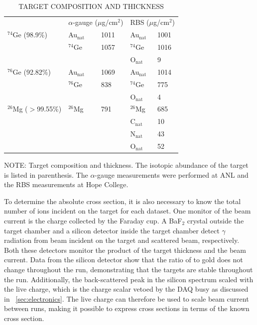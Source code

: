 \begin{table}[htp]
\centering
\caption[\uppercase{target composition and thickness}]{\\\uppercase{target composition and thickness}}
\label{tab:targets}
\begin{tabular}{lllll}\toprule
 & \multicolumn{2}{c}{$\alpha$-gauge ($\mu$g/cm$^2$)} & \multicolumn{2}{c}{RBS ($\mu$g/cm$^2$)} \\
\cmidrule(r){2-5}
$^{74}$Ge (98.9\%) & Au$_{\text{nat}}$ & 1011 & Au$_{\text{nat}}$ & 1001 \\
          & $^{74}$Ge & 1057 & $^{74}$Ge & 1016 \\
          &           &      & O$_{\text{nat}}$ & 9 \\[0.35cm]

$^{76}$Ge (92.82\%) & Au$_{\text{nat}}$ & 1069 & Au$_{\text{nat}}$ & 1014 \\
          & $^{76}$Ge & 838 & $^{74}$Ge & 775 \\
          &           &      & O$_{\text{nat}}$ & 4 \\[0.35cm]

$^{26}$Mg ($>$99.55\%) & $^{26}$Mg & 791 & $^{26}$Mg & 685 \\
          &           &      & C$_{\text{nat}}$ & 10 \\
          &           &      & N$_{\text{nat}}$ & 43 \\
          &           &      & O$_{\text{nat}}$ & 52 \\
\bottomrule
\end{tabular}
\begin{flushleft}
\small NOTE:
Target composition and thickness.  The isotopic abundance of the target is listed in parenthesis.  The $\alpha$-gauge measurements were performed at ANL and the RBS measurements at Hope College.
\end{flushleft}
\end{table}

To determine the absolute cross section, it is also necessary to know the total number of  ions incident on the target for each dataset.  One monitor of the beam current is the charge collected by the Faraday cup.  A BaF$_2$ crystal outside the target chamber and a silicon detector inside the target chamber detect $\gamma$ radiation from beam incident on the target and scattered  beam, respectively.  Both these detectors monitor the product of the target thickness and the beam current.  Data from the silicon detector show that the ratio of \GeTargets to gold does not change throughout the run, demonstrating that the targets are stable throughout the run.  Additionally, the back-scattered peak in the silicon spectrum scaled with the live charge, which is the charge scalar vetoed by the DAQ busy as discussed in {\sect}~\ref{sec:electronics}.  The live charge can therefore be used to scale beam current between runs, making it possible to express \reaction cross sections in terms of the known \MgReaction cross section.

